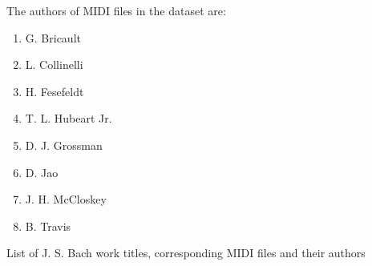 \documentclass[a4paper, 11pt, twoside]{report}
\theoremstyle{definition}
\begin{document}
\vfill

The authors of MIDI files in the dataset are:

\begin{enumerate}
    \item G. Bricault
    \item L. Collinelli
    \item H. Fesefeldt
    \item T. L. Hubeart Jr.
    \item D. J. Grossman
    \item D. Jao
    \item J. H. McCloskey
    \item B. Travis
\end{enumerate} \par

\vfill

\newpage
\begin{table}[H]
    \caption{List of J. S. Bach work titles, corresponding MIDI files and their authors \cite{MIDI_Dave}\cite{MIDI_kunst}\cite{MIDI_central}}
    \label{tab:Bach_works}
\end{table}
\addtocounter{table}{-1}
\end{document}
